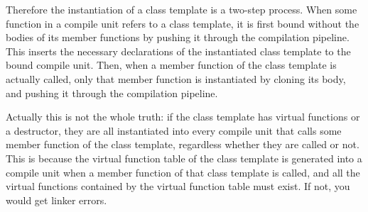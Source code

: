 \documentclass[a4paper,oneside,11pt]{book}
\theoremstyle{definition}
\begin{document}
Therefore the instantiation of a class template is a two-step process.
When some function in a compile unit refers to a class template,
it is first bound without the bodies of its member functions by pushing it through the compilation pipeline.
This inserts the necessary declarations of the instantiated class template to the bound compile unit.
Then, when a member function of the class template is actually called, only that member function is instantiated by cloning its body,
and pushing it through the compilation pipeline.

Actually this is not the whole truth: if the class template has virtual functions or a destructor, they are all instantiated into every compile unit
that calls some member function of the class template, regardless whether they are called or not.
This is because the virtual function table of the class template is generated into a compile unit when a member function of that class template is called,
and all the virtual functions contained by the virtual function table must exist. If not, you would get linker errors.
\end{document}
